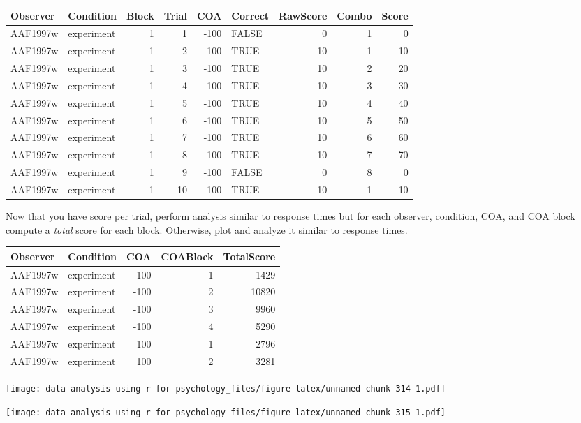 \documentclass[
]{book}
\begin{document}
\begin{tabular}{l|l|r|r|r|l|r|r|r}
\hline
Observer & Condition & Block & Trial & COA & Correct & RawScore & Combo & Score\\
\hline
AAF1997w & experiment & 1 & 1 & -100 & FALSE & 0 & 1 & 0\\
\hline
AAF1997w & experiment & 1 & 2 & -100 & TRUE & 10 & 1 & 10\\
\hline
AAF1997w & experiment & 1 & 3 & -100 & TRUE & 10 & 2 & 20\\
\hline
AAF1997w & experiment & 1 & 4 & -100 & TRUE & 10 & 3 & 30\\
\hline
AAF1997w & experiment & 1 & 5 & -100 & TRUE & 10 & 4 & 40\\
\hline
AAF1997w & experiment & 1 & 6 & -100 & TRUE & 10 & 5 & 50\\
\hline
AAF1997w & experiment & 1 & 7 & -100 & TRUE & 10 & 6 & 60\\
\hline
AAF1997w & experiment & 1 & 8 & -100 & TRUE & 10 & 7 & 70\\
\hline
AAF1997w & experiment & 1 & 9 & -100 & FALSE & 0 & 8 & 0\\
\hline
AAF1997w & experiment & 1 & 10 & -100 & TRUE & 10 & 1 & 10\\
\hline
\end{tabular}

Now that you have score per trial, perform analysis similar to response times but for each observer, condition, COA, and COA block compute a \emph{total} score for each block. Otherwise, plot and analyze it similar to response times.

\begin{tabular}{l|l|r|r|r}
\hline
Observer & Condition & COA & COABlock & TotalScore\\
\hline
AAF1997w & experiment & -100 & 1 & 1429\\
\hline
AAF1997w & experiment & -100 & 2 & 10820\\
\hline
AAF1997w & experiment & -100 & 3 & 9960\\
\hline
AAF1997w & experiment & -100 & 4 & 5290\\
\hline
AAF1997w & experiment & 100 & 1 & 2796\\
\hline
AAF1997w & experiment & 100 & 2 & 3281\\
\hline
\end{tabular}

\texttt{[image: data-analysis-using-r-for-psychology\_files/figure-latex/unnamed-chunk-314-1.pdf]}

\texttt{[image: data-analysis-using-r-for-psychology\_files/figure-latex/unnamed-chunk-315-1.pdf]}
\end{document}
